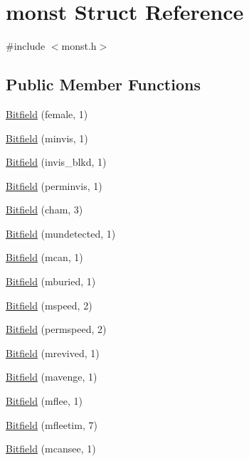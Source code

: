\hypertarget{structmonst}{\section{monst Struct Reference}
\label{structmonst}
}


{\ttfamily \#include $<$monst.\+h$>$}

\subsection*{Public Member Functions}
\begin{DoxyCompactItemize}
\item 
\hyperlink{structmonst_ad7fe473e3dc60ae071b2cbc934a9ed01}{Bitfield} (female, 1)
\item 
\hyperlink{structmonst_adbdb85161ae5b2e700ec4e3b6816475f}{Bitfield} (minvis, 1)
\item 
\hyperlink{structmonst_a2c563bd5339f1749f9b51ef61166d694}{Bitfield} (invis\+\_\+blkd, 1)
\item 
\hyperlink{structmonst_a6c3ef39ff004ad3b4d618594eb95a5a4}{Bitfield} (perminvis, 1)
\item 
\hyperlink{structmonst_a3607aedb74e5c6aa3eb1c6c64e42956f}{Bitfield} (cham, 3)
\item 
\hyperlink{structmonst_acf8113e50326f241a421609f7ae3c8df}{Bitfield} (mundetected, 1)
\item 
\hyperlink{structmonst_a056db88aa0b6c623afed56577d135072}{Bitfield} (mcan, 1)
\item 
\hyperlink{structmonst_a9a92c420ef77260ed2ffe740c20c2ceb}{Bitfield} (mburied, 1)
\item 
\hyperlink{structmonst_ac7f294cb3610a6373cfee3e0a74babbc}{Bitfield} (mspeed, 2)
\item 
\hyperlink{structmonst_a12a643509e1e678d3dab144176d773a8}{Bitfield} (permspeed, 2)
\item 
\hyperlink{structmonst_ab8e0efe244e96cf18d3bbfd0d83b7098}{Bitfield} (mrevived, 1)
\item 
\hyperlink{structmonst_a9c15b6073a180bfa355e7f12b00513b6}{Bitfield} (mavenge, 1)
\item 
\hyperlink{structmonst_a67a3b0425b7510587514bdc176d9727b}{Bitfield} (mflee, 1)
\item 
\hyperlink{structmonst_ae502776da7e45061f4716bf7b2eab3e4}{Bitfield} (mfleetim, 7)
\item 
\hyperlink{structmonst_a2a3dcef7b822b9c68013473f6a8634e4}{Bitfield} (mcansee, 1)
\item 

\end{DoxyCompactItemize}
